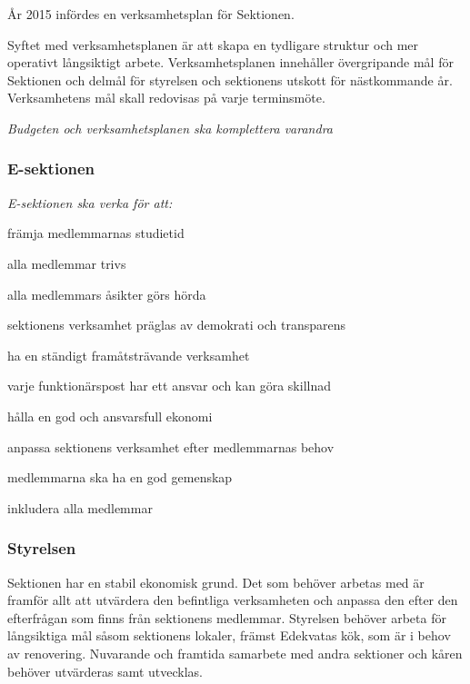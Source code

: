 \documentclass[../_main/handlingar.tex]{subfiles}
\begin{document}
År 2015 infördes en verksamhetsplan för Sektionen.

Syftet med verksamhetsplanen är att skapa en tydligare struktur och mer operativt långsiktigt arbete. Verksamhetsplanen innehåller övergripande mål för Sektionen och delmål för styrelsen och sektionens utskott för nästkommande år. Verksamhetens mål skall redovisas på varje terminsmöte.

\emph{Budgeten och verksamhetsplanen ska komplettera varandra}

\subsubsection*{E-sektionen}
\emph{E-sektionen ska verka för att:}
\begin{dashlist}
    \item främja medlemmarnas studietid
    \item alla medlemmar trivs
    \item alla medlemmars åsikter görs hörda
    \item sektionens verksamhet präglas av demokrati och transparens
    \item ha en ständigt framåtsträvande verksamhet
    \item varje funktionärspost har ett ansvar och kan göra skillnad
    \item hålla en god och ansvarsfull ekonomi
    \item anpassa sektionens verksamhet efter medlemmarnas behov
    \item medlemmarna ska ha en god gemenskap
    \item inkludera alla medlemmar
\end{dashlist}

\subsubsection*{Styrelsen}
Sektionen har en stabil ekonomisk grund. Det som behöver arbetas med är framför allt att utvärdera den befintliga verksamheten och anpassa den efter den efterfrågan som finns från sektionens medlemmar. Styrelsen behöver arbeta för långsiktiga mål såsom sektionens lokaler, främst Edekvatas kök, som är i behov av renovering. Nuvarande och framtida samarbete med andra sektioner och kåren behöver utvärderas samt utvecklas.
\end{document}
